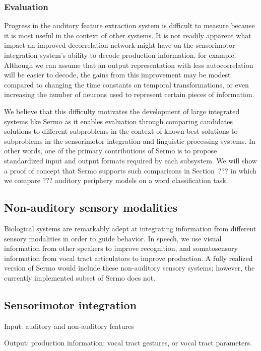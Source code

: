 \subsubsection{Evaluation}

Progress in the auditory feature extraction system
is difficult to measure
because it is most useful
in the context of other systems.
It is not readily apparent
what impact
an improved decorrelation network
might have on the sensorimotor integration
system's ability to decode production information,
for example.
Although we can assume that
an output representation with
less autocorrelation
will be easier to decode,
the gains from this improvement
may be modest compared to
changing the time constants on temporal transformations,
or even increasing the number of neurons
used to represent certain pieces of information.

We believe that this difficulty
motivates the development
of large integrated systems
like Sermo
as it enables evaluation
through comparing candidates solutions
to different subproblems
in the context of
known best solutions
to subproblems in the sensorimotor integration
and linguistic processing systems.
In other words,
one of the primary contributions of Sermo
is to propose standardized input and output formats
required by each subsystem.
We will show a proof of concept
that Sermo supports such comparisons
in Section~??? in which we compare
??? auditory periphery models
on a word classification task.

\subsection{Non-auditory sensory modalities}

Biological systems are remarkably adept
at integrating information
from different sensory modalities
in order to guide behavior.
In speech,
we use visual information
from other speakers to improve recognition,
and somatosensory information
from vocal tract articulators
to improve production.
A fully realized version of Sermo
would include these non-auditory sensory systems;
however, the currently implemented
subset of Sermo does not.

\subsection{Sensorimotor integration}

Input: auditory and non-auditory features

Output: production information: vocal tract gestures,
or vocal tract parameters.

